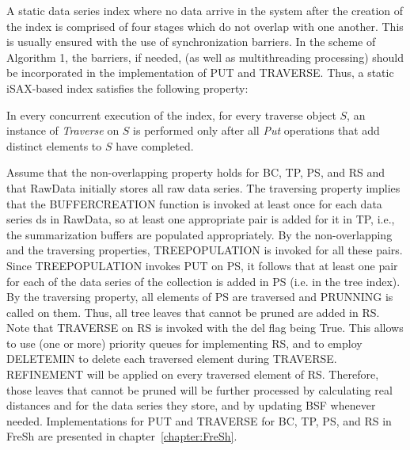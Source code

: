 A static data series index where no data arrive in the system after the creation of the
index is comprised of four stages which do not overlap with one another. This is
usually ensured with the use of synchronization barriers. In the scheme of Algorithm 1,
the barriers, if needed, (as well as multithreading processing) should be incorporated
in the implementation of PUT and TRAVERSE. Thus, a static iSAX-based
index satisfies the following property:
% 
\begin{definition}
    \label{def:non-overlapping}
    In every concurrent execution of the index, for every traverse object $S$, an
    instance of \textit{Traverse} on $S$ is performed only after all \textit{Put}
    operations that add distinct elements to $S$ have completed.
\end{definition}
% 
Assume that the non-overlapping property holds for BC, TP, PS, and RS and that RawData
initially stores all raw data series. The traversing property implies that the
BUFFERCREATION function is invoked at least once for each data series ds in RawData, so
at least one appropriate pair is added for it in TP, i.e., the summarization buffers
are populated appropriately. By the non-overlapping and the traversing properties,
TREEPOPULATION is invoked for all these pairs. Since TREEPOPULATION invokes PUT on PS,
it follows that at least one pair for each of the data series of the collection is
added in PS (i.e. in the tree index). By the traversing property, all elements of PS
are traversed and PRUNNING is called on them. Thus, all tree leaves that cannot be
pruned are added in RS. Note that TRAVERSE on RS is invoked with the del flag being True.
This allows to use (one or more) priority queues for implementing RS, and to employ
DELETEMIN to delete each traversed element during TRAVERSE. REFINEMENT will be applied
on every traversed element of RS. Therefore, those leaves that cannot be pruned will be
further processed by calculating real distances and for the data series they store,
and by updating BSF whenever needed. Implementations for PUT and TRAVERSE for BC, TP,
PS, and RS in FreSh are presented in chapter~\ref{chapter:FreSh}.

